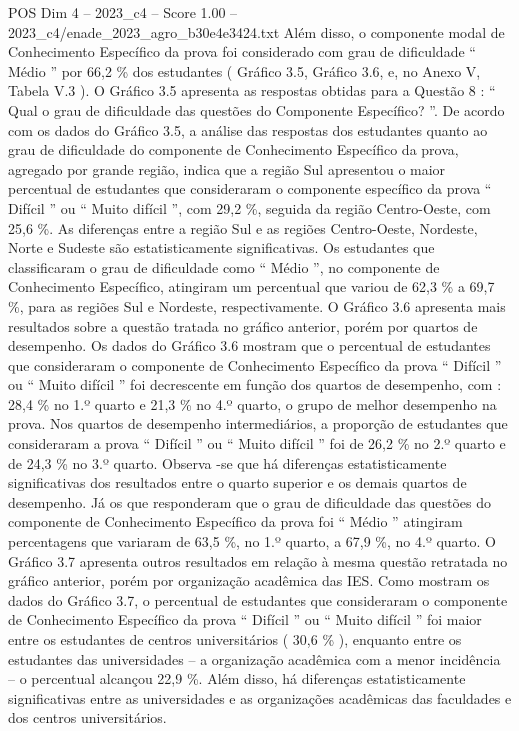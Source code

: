 \begin{textsample}{POS Dim 4 – 2023\_c4 – Score 1.00 – 2023\_c4/enade\_2023\_agro\_b30e4e3424.txt}
Além disso, o componente modal de Conhecimento Específico da prova foi considerado com grau de dificuldade “ Médio ” por 66,2 \% dos estudantes ( Gráfico 3.5, Gráfico 3.6, e, no Anexo V, Tabela V.3 ).
O Gráfico 3.5 apresenta as respostas obtidas para a Questão 8 : “ Qual o grau de dificuldade das questões do Componente Específico? ”.
De acordo com os dados do Gráfico 3.5, a análise das respostas dos estudantes quanto ao grau de dificuldade do componente de Conhecimento Específico da prova, agregado por grande região, indica que a região Sul apresentou o maior percentual de estudantes que consideraram o componente específico da prova “ Difícil ” ou “ Muito difícil ”, com 29,2 \%, seguida da região Centro-Oeste, com 25,6 \%.
As diferenças entre a região Sul e as regiões Centro-Oeste, Nordeste, Norte e Sudeste são estatisticamente significativas.
Os estudantes que classificaram o grau de dificuldade como “ Médio ”, no componente de Conhecimento Específico, atingiram um percentual que variou de 62,3 \% a 69,7 \%, para as regiões Sul e Nordeste, respectivamente.
O Gráfico 3.6 apresenta mais resultados sobre a questão tratada no gráfico anterior, porém por quartos de desempenho.
Os dados do Gráfico 3.6 mostram que o percentual de estudantes que consideraram o componente de Conhecimento Específico da prova “ Difícil ” ou “ Muito difícil ” foi decrescente em função dos quartos de desempenho, com : 28,4 \% no 1.º quarto e 21,3 \% no 4.º quarto, o grupo de melhor desempenho na prova.
Nos quartos de desempenho intermediários, a proporção de estudantes que consideraram a prova “ Difícil ” ou “ Muito difícil ” foi de 26,2 \% no 2.º quarto e de 24,3 \% no 3.º quarto.
Observa -se que há diferenças estatisticamente significativas dos resultados entre o quarto superior e os demais quartos de desempenho.
Já os que responderam que o grau de dificuldade das questões do componente de Conhecimento Específico da prova foi “ Médio ” atingiram percentagens que variaram de 63,5 \%, no 1.º quarto, a 67,9 \%, no 4.º quarto.
O Gráfico 3.7 apresenta outros resultados em relação à mesma questão retratada no gráfico anterior, porém por organização acadêmica das IES.
Como mostram os dados do Gráfico 3.7, o percentual de estudantes que consideraram o componente de Conhecimento Específico da prova “ Difícil ” ou “ Muito difícil ” foi maior entre os estudantes de centros universitários ( 30,6 \% ), enquanto entre os estudantes das universidades – a organização acadêmica com a menor incidência – o percentual alcançou 22,9 \%.
Além disso, há diferenças estatisticamente significativas entre as universidades e as organizações acadêmicas das faculdades e dos centros universitários.

\end{textsample}
